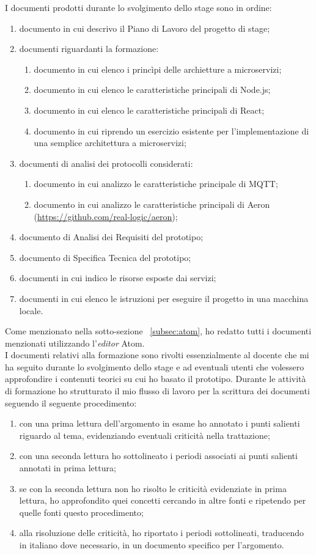 I documenti prodotti durante lo svolgimento dello stage sono in ordine:
\begin{enumerate}
	\item documento in cui descrivo il Piano di Lavoro del progetto di stage;
	\item documenti riguardanti la formazione:
		\begin{enumerate}
			\item documento in cui elenco i princìpi delle archietture a microservizi;
			\item documento in cui elenco le caratteristiche principali di Node.js;
			\item documento in cui elenco le caratteristiche principali di React;
			\item documento in cui riprendo un esercizio esistente per l'implementazione di una semplice architettura a microservizi;
		\end{enumerate}
		\item documenti di analisi dei protocolli considerati:
		\begin{enumerate}
			\item documento in cui analizzo le caratteristiche principale di MQTT;
			\item documento in cui analizzo le caratteristiche principali di Aeron (\url{https://github.com/real-logic/aeron});
		\end{enumerate}
		\item documento di Analisi dei Requisiti del prototipo;
		\item documento di Specifica Tecnica del prototipo;
		\item documenti in cui indico le risorse esposte dai servizi;
		\item documenti in cui elenco le istruzioni per eseguire il progetto in una macchina locale.
\end{enumerate}
Come menzionato nella sotto-sezione ~\ref{subsec:atom}, ho redatto tutti i documenti menzionati utilizzando l'\emph{editor} Atom.\\
I documenti relativi alla formazione sono rivolti essenzialmente al docente che mi ha seguito durante lo svolgimento dello stage e ad eventuali utenti che volessero approfondire i contenuti teorici su cui ho basato il prototipo. Durante le attività di formazione ho strutturato il mio flusso di lavoro per la scrittura dei documenti seguendo il seguente procedimento:
\begin{enumerate}
  \item con una prima lettura dell'argomento in esame ho annotato i punti salienti riguardo al tema, evidenziando eventuali criticità nella trattazione;
  \item con una seconda lettura ho sottolineato i periodi associati ai punti salienti annotati in prima lettura;
  \item se con la seconda lettura non ho risolto le criticità evidenziate in prima lettura, ho approfondito quei concetti cercando in altre fonti e ripetendo per quelle fonti questo procedimento;
  \item alla risoluzione delle criticità, ho riportato i periodi sottolineati, traducendo in italiano dove necessario, in un documento specifico per l'argomento.
\end{enumerate}
